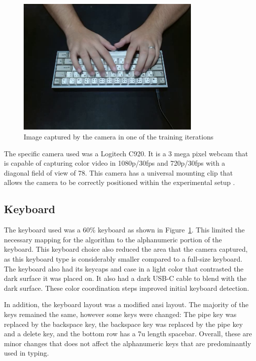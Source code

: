 \documentclass{report}
\begin{document}
\begin{figure}[H]
	\centering
	\includegraphics[width=0.8\textwidth]{actual-keeb.png}
	\caption{Image captured by the camera in one of the training iterations}
	\label{fig:metho-setup-keeb}
\end{figure}

The specific camera used was a Logitech C920. It is a 3 mega pixel webcam that
is capable of capturing color video in 1080p/30fps and 720p/30fps with a
diagonal field of view of 78\degree. This camera has a universal mounting clip
that allows the camera to be correctly positioned within the experimental setup
\parencite{logitech}.

\subsection{Keyboard}
\label{section:metho-keeb}

The keyboard used was a 60\% keyboard as shown in
Figure~\ref{fig:metho-setup-keeb}. This limited the necessary mapping for the
algorithm to the alphanumeric portion of the keyboard. This keyboard choice also
reduced the area that the camera captured, as this keyboard type is considerably
smaller compared to a full-size keyboard. The keyboard also had its keycaps and
case in a light color that contrasted the dark surface it was placed on. It also
had a dark USB-C cable to blend with the dark surface. These color coordination
steps improved initial keyboard detection.

In addition, the keyboard layout was a modified \ac{ansi} layout. The majority
of the keys remained the same, however some keys were changed: The pipe key was
replaced by the backspace key, the backspace key was replaced by the pipe key
and a delete key, and the bottom row has a 7u length spacebar. Overall, these
are minor changes that does not affect the alphanumeric keys that are
predominantly used in typing.
\end{document}
